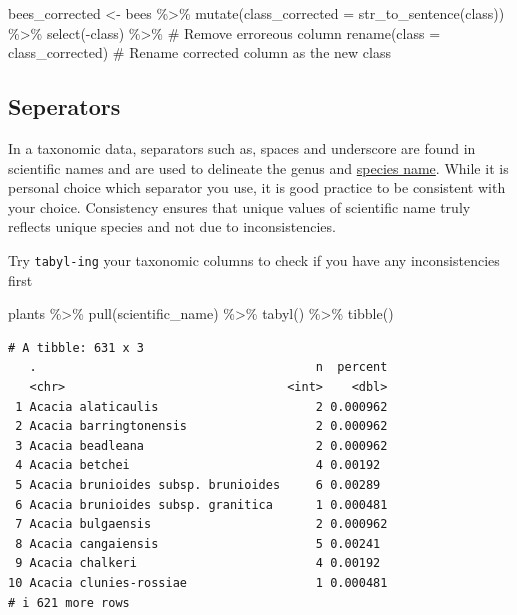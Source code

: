 \documentclass[
  letterpaper,
  DIV=11,
  numbers=noendperiod,
  oneside]{scrreprt}
\newenvironment{Shaded}{\begin{snugshade}}{\end{snugshade}}
\newcommand{\AttributeTok}[1]{\textcolor[rgb]{0.40,0.45,0.13}{#1}}
\newcommand{\CommentTok}[1]{\textcolor[rgb]{0.37,0.37,0.37}{#1}}
\newcommand{\FunctionTok}[1]{\textcolor[rgb]{0.28,0.35,0.67}{#1}}
\newcommand{\NormalTok}[1]{\textcolor[rgb]{0.00,0.23,0.31}{#1}}
\newcommand{\OtherTok}[1]{\textcolor[rgb]{0.00,0.23,0.31}{#1}}
\newcommand{\SpecialCharTok}[1]{\textcolor[rgb]{0.37,0.37,0.37}{#1}}
\begin{document}
\begin{Shaded}
\begin{Highlighting}[]
\NormalTok{bees\_corrected }\OtherTok{\textless{}{-}}\NormalTok{ bees }\SpecialCharTok{\%\textgreater{}\%} 
  \FunctionTok{mutate}\NormalTok{(}\AttributeTok{class\_corrected =} \FunctionTok{str\_to\_sentence}\NormalTok{(class)) }\SpecialCharTok{\%\textgreater{}\%} 
  \FunctionTok{select}\NormalTok{(}\SpecialCharTok{{-}}\NormalTok{class) }\SpecialCharTok{\%\textgreater{}\%} \CommentTok{\# Remove erroreous column }
  \FunctionTok{rename}\NormalTok{(}\AttributeTok{class =}\NormalTok{ class\_corrected) }\CommentTok{\# Rename corrected column as the new \textquotesingle{}class\textquotesingle{}}
\end{Highlighting}
\end{Shaded}

\hypertarget{seperators}{%
\subsection{Seperators}\label{seperators}}

In a taxonomic data, separators such as, spaces and underscore are found
in scientific names and are used to delineate the genus and
\href{https://dwc.tdwg.org/terms/\#dwc:specificEpithet}{species name}.
While it is personal choice which separator you use, it is good practice
to be consistent with your choice. Consistency ensures that unique
values of scientific name truly reflects unique species and not due to
inconsistencies.

Try \texttt{tabyl-ing} your taxonomic columns to check if you have any
inconsistencies first

\begin{Shaded}
\begin{Highlighting}[]
\NormalTok{plants }\SpecialCharTok{\%\textgreater{}\%} 
  \FunctionTok{pull}\NormalTok{(scientific\_name) }\SpecialCharTok{\%\textgreater{}\%} 
  \FunctionTok{tabyl}\NormalTok{() }\SpecialCharTok{\%\textgreater{}\%} 
  \FunctionTok{tibble}\NormalTok{()}
\end{Highlighting}
\end{Shaded}

\begin{verbatim}
# A tibble: 631 x 3
   .                                       n  percent
   <chr>                               <int>    <dbl>
 1 Acacia alaticaulis                      2 0.000962
 2 Acacia barringtonensis                  2 0.000962
 3 Acacia beadleana                        2 0.000962
 4 Acacia betchei                          4 0.00192 
 5 Acacia brunioides subsp. brunioides     6 0.00289 
 6 Acacia brunioides subsp. granitica      1 0.000481
 7 Acacia bulgaensis                       2 0.000962
 8 Acacia cangaiensis                      5 0.00241 
 9 Acacia chalkeri                         4 0.00192 
10 Acacia clunies-rossiae                  1 0.000481
# i 621 more rows
\end{verbatim}
\end{document}
